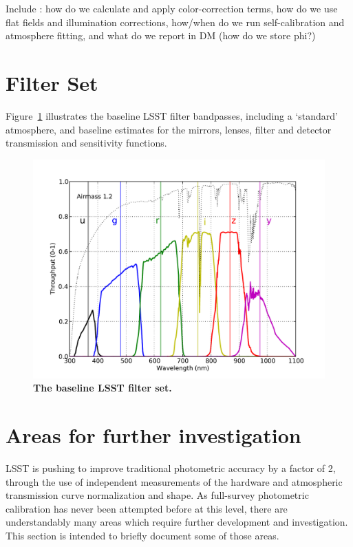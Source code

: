 \documentclass[12pt,preprint]{aastex}
\begin{document}
Include : how do we calculate and apply color-correction terms, how do we use flat fields and illumination corrections, how/when do we run self-calibration and atmosphere fitting, and what do we report in DM (how do we store phi?)






\appendix

\newpage
\section{Filter Set}

Figure~\ref{fig:filterset} illustrates the baseline LSST filter
bandpasses, including a `standard' atmosphere, and baseline estimates
for the mirrors, lenses, filter and detector transmission and
sensitivity functions. 

\begin{figure}[h!]
\centering
\includegraphics[width=5in]{filters}
\caption{{\small {\bf The baseline LSST filter set.}}
\label{fig:filterset}}
\end{figure}


\section{Areas for further investigation}
\label{sec:investigation}

LSST is pushing to improve traditional photometric accuracy by a
factor of 2, through the use of independent measurements of the
hardware and atmospheric transmission curve normalization and
shape. As full-survey photometric calibration has never been attempted
before at this level, there are understandably many areas which
require further development and investigation.  This section is
intended to briefly document some of those areas.
\end{document}
